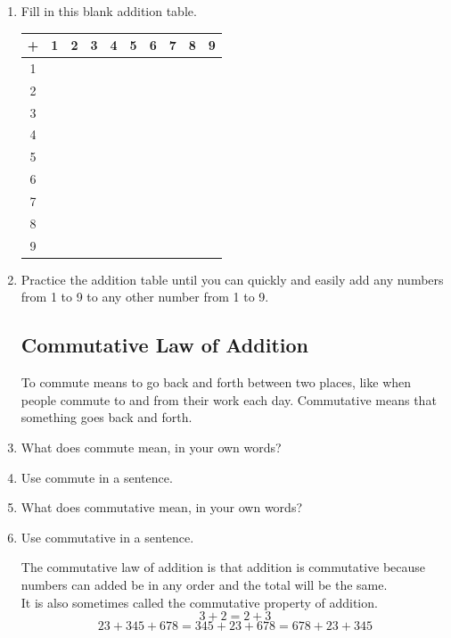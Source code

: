 \documentclass[12pt]{article}
\begin{document}
\begin{enumerate}
\item Fill in this blank addition table.

\begin{table}[h]
\centering
\begin{tabular}{|c|c|c|c|c|c|c|c|c|c|}
\hline
+ & 1 & 2 & 3 & 4 & 5 & 6 & 7 & 8 & 9 \\ \hline
1 & & & & & & & & &  \\ \hline
2 & & & & & & & & &  \\ \hline
3 & & & & & & & & &  \\ \hline
4 & & & & & & & & &  \\ \hline
5 & & & & & & & & &  \\ \hline
6 & & & & & & & & &  \\ \hline
7 & & & & & & & & &  \\ \hline
8 & & & & & & & & &  \\ \hline
9 & & & & & & & & &  \\ \hline
\end{tabular}
\end{table}

\item Practice the addition table until you can quickly and easily add any numbers from 1 to 9 to any other number from 1 to 9.

\subsection*{Commutative Law of Addition}

To commute means to go back and forth between two places, like when people commute to and from their work each day. Commutative means that something goes back and forth.\\

\item What does commute mean, in your own words?
\item Use commute in a sentence.
\item What does commutative mean, in your own words?
\item Use commutative in a sentence.

The commutative law of addition is that addition is commutative because numbers can added be in any order and the total will be the same.\\

It is also sometimes called the commutative property of addition.\\

$$3+2=2+3$$
$$23+345+678=345+23+678=678+23+345$$


\end{enumerate}
\end{document}

